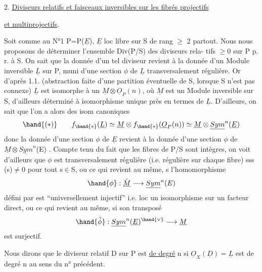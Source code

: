 
2. \uline{Diviseurs relatifs et faisceaux inversibles sur les fibrés projectifs}

\uline{et multiprojectifs}.

 Soit comme au N°1 P=P($\underline{E}$), $\underline{E}$ loc libre sur S de rang $\geqslant$ 2 partout.
Nous nous proposons de déterminer l'ensemble Div(P/S) des diviseurs rela-%
tifs $\geqslant 0$ sur P p. r. à S. On sait que la donnée d'un tel diviseur revient à la
donnée d'un Module inversible $\underline{L}$ sur P, muni d'une section $\phi$ de $\underline{L}$
transversalement régulière. Or d'après 1.1. (abstraction faite d'une
partition éventuelle de S, lorsque S n'est pas connexe) $\underline{L}$ est isomorphe
à un $\underline{M}\otimes\underline{O}_P(n)$, où $\underline{M}$ est un Module inversible sur S, d'ailleurs déterminé
à isomorphisme unique près en termes de $\underline{L}$. D'ailleurs, on sait que
l'on a alors des isom canoniques
\[ \hand{(*)} \qquad f_{\hand{*}}(\underline{L}) \simeq \underline{M}\otimes f_{\hand{*}}(\underline{O}_P(n)) \simeq \underline{M}\otimes\underline{Sym}^n(\underline{E}) \]
donc la donnée d'une section  $\phi$ de $\underline{E}$ revient à la donnée d'une section
$\phi$ de $\underline{M}\otimes\underline{Sym}^n$(E) . Compte tenu du fait que les fibres de P/S sont intègres,
on voit d'ailleurs que $\phi$ est transversalement régulière (i.e. régulière
sur chaque fibre) sss \hand{$\phi$}(s)$\neq$0 pour tout s$\in$S, ou ce qui revient au même,
s l'homomorphisme
\[ \hand{\phi} : \check{\underline{M}} \longrightarrow \underline{Sym}^n(E) \]
défini par \hand{$\phi$} est ``universellement injectif'' i.e. loc un isomorphisme sur
un facteur direct, ou ce qui revient au même, si son transposé
\[ \hand{\check{\phi}} : \underline{Sym}^n(\underline{E})^{\hand{\vee}} \longrightarrow \underline{M} \]
est surjectif.

Nous dirons que le diviseur relatif D sur P est \uline{de degré} n
si $\underline{O}_X(\underline{D})= \underline{L}$ est de degré n au sens du n° précédent. 



